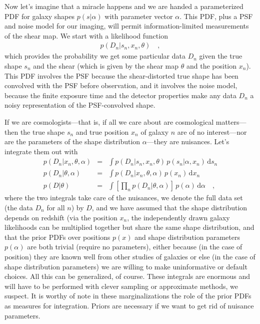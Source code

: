 \documentclass[12pt, pdftex]{article}
\newcommand{\dd}{\mathrm{d}}
\newcommand{\shearpars}{\theta}
\newcommand{\position}{x}
\newcommand{\data}{D}
\newcommand{\shape}{s}
\newcommand{\shapepars}{\alpha}
\begin{document}
Now let's imagine that a miracle happens and we are handed a
parameterized PDF for galaxy shapes $p(\shape|\shapepars)$ with
parameter vector $\shapepars$.  This PDF, plus a PSF and noise model
for our imaging, will permit information-limited measurements of the
shear map.  We start with a likelihood function
\begin{eqnarray}\displaystyle
p(\data_n|\shape_n,\position_n,\shearpars)
\quad ,
\end{eqnarray}
which provides the probability we get some particular data $\data_n$
given the true shape $\shape_n$ and the shear (which is given by the
shear map $\shearpars$ and the position $\position_n$).  This PDF
involves the PSF because the shear-distorted true shape has been
convolved with the PSF before observation, and it involves the noise
model, because the finite exposure time and the detector properties
make any data $\data_n$ a noisy representation of the PSF-convolved
shape.

If we are cosmologists---that is, if all we care about are
cosmological matters---then the true shape $\shape_n$ and true
position $\position_n$ of galaxy $n$ are of no interest---nor are the
parameters of the shape distribution $\shapepars$---they are
nuisances.  Let's integrate them out with
\begin{eqnarray}\displaystyle
p(\data_n|\position_n,\shearpars,\shapepars) &=&
\int p(\data_n|\shape_n,\position_n,\shearpars)\,p(\shape_n|\shapepars,\position_n)\,\dd\shape_n
\\
p(\data_n|\shearpars,\shapepars) &=&
\int p(\data_n|\position_n,\shearpars,\shapepars)\,p(\position_n)\,\dd\position_n
\\
p(\data|\shearpars) &=&
\int \left[\prod_n p(\data_n|\shearpars,\shapepars)\right]\,p(\shapepars)\,\dd\shapepars
\quad ,
\end{eqnarray}
where the two integrals take care of the nuisances, we denote the full
data set (the data $\data_n$ for all $n$) by $\data$, and we have
assumed that the shape distribution depends on redshift (via the
position $\position_n$, the independently drawn galaxy likelihoods can
be multiplied together but share the same shape distribution, and that
the prior PDFs over positions $p(\position)$ and shape distribution
parameters $p(\shapepars)$ are both trivial (require no parameters),
either because (in the case of position) they are known well from
other studies of galaxies or else (in the case of shape distribution
parameters) we are willing to make uninformative or default choices.
All this can be generalized, of course.  These integrals are enormous
and will have to be performed with clever sampling or approximate
methods, we suspect.  It is worthy of note in these marginalizations
the role of the prior PDFs as measures for integration.  Priors are
necessary if we want to get rid of nuisance parameters.
\end{document}
